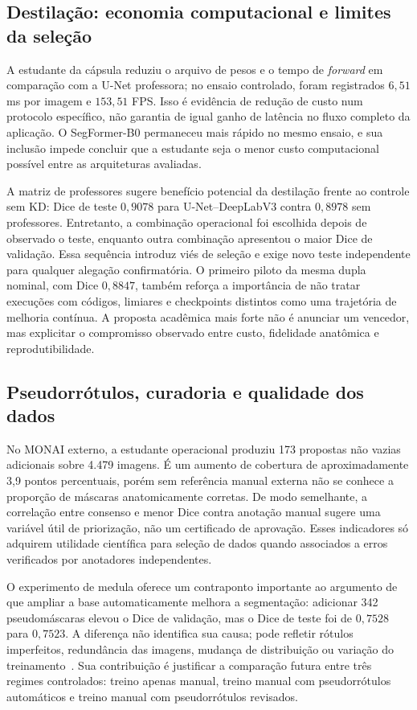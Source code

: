 \documentclass[12pt]{article}
\begin{document}
\subsection{Destilação: economia computacional e limites da seleção}
A estudante da cápsula reduziu o arquivo de pesos e o tempo de \textit{forward} em comparação com a U-Net professora; no ensaio controlado, foram registrados $6{,}51$ ms por imagem e $153{,}51$ FPS. Isso é evidência de redução de custo num protocolo específico, não garantia de igual ganho de latência no fluxo completo da aplicação. O SegFormer-B0 permaneceu mais rápido no mesmo ensaio, e sua inclusão impede concluir que a estudante seja o menor custo computacional possível entre as arquiteturas avaliadas.

A matriz de professores sugere benefício potencial da destilação frente ao controle sem KD: Dice de teste $0{,}9078$ para U-Net--DeepLabV3 contra $0{,}8978$ sem professores. Entretanto, a combinação operacional foi escolhida depois de observado o teste, enquanto outra combinação apresentou o maior Dice de validação. Essa sequência introduz viés de seleção e exige novo teste independente para qualquer alegação confirmatória. O primeiro piloto da mesma dupla nominal, com Dice $0{,}8847$, também reforça a importância de não tratar execuções com códigos, limiares e checkpoints distintos como uma trajetória de melhoria contínua. A proposta acadêmica mais forte não é anunciar um vencedor, mas explicitar o compromisso observado entre custo, fidelidade anatômica e reprodutibilidade.

\subsection{Pseudorrótulos, curadoria e qualidade dos dados}
No MONAI externo, a estudante operacional produziu 173 propostas não vazias adicionais sobre 4.479 imagens. É um aumento de cobertura de aproximadamente 3,9 pontos percentuais, porém sem referência manual externa não se conhece a proporção de máscaras anatomicamente corretas. De modo semelhante, a correlação entre consenso e menor Dice contra anotação manual sugere uma variável útil de priorização, não um certificado de aprovação. Esses indicadores só adquirem utilidade científica para seleção de dados quando associados a erros verificados por anotadores independentes.

O experimento de medula oferece um contraponto importante ao argumento de que ampliar a base automaticamente melhora a segmentação: adicionar 342 pseudomáscaras elevou o Dice de validação, mas o Dice de teste foi de $0{,}7528$ para $0{,}7523$. A diferença não identifica sua causa; pode refletir rótulos imperfeitos, redundância das imagens, mudança de distribuição ou variação do treinamento~\cite{Tajbakhsh2020Imperfect,Su2024ReliablePseudo}. Sua contribuição é justificar a comparação futura entre três regimes controlados: treino apenas manual, treino manual com pseudorrótulos automáticos e treino manual com pseudorrótulos revisados.
\end{document}
